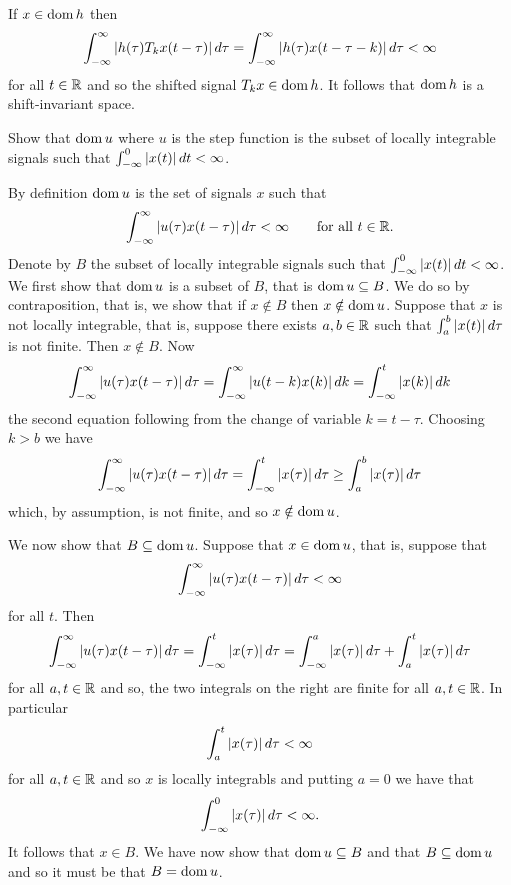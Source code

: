 \begin{excersizelist}
\begin{solution}
If $x \in \operatorname{dom} h$ then
\[
\int_{-\infty}^\infty \left\vert h(\tau) T_k x(t - \tau) \right\vert d\tau = \int_{-\infty}^\infty \left\vert h(\tau) x(t - \tau - k) \right\vert d\tau < \infty
\]
for all $t \in {\mathbb R}$ and so the shifted signal $T_k x \in \operatorname{dom} h$.  It follows that $\operatorname{dom} h$ is a shift-invariant space.
\end{solution}

\item Show that $\operatorname{dom} u$ where $u$ is the step function is the subset of locally integrable signals such that $\int_{-\infty}^0\left\vert x(t) \right\vert dt < \infty$.
\begin{solution}
By definition $\operatorname{dom} u$ is the set of signals $x$ such that
\[
\int_{-\infty}^{\infty} \left\vert u(\tau) x(t - \tau) \right\vert d\tau < \infty \qquad \text{for all $t \in {\mathbb R}$}.
\]
Denote by $B$ the subset of locally integrable signals such that $\int_{-\infty}^0\left\vert x(t) \right\vert dt < \infty$.  We first show that $\operatorname{dom} u$ is a subset of $B$, that is $\operatorname{dom} u \subseteq B$.  We do so by contraposition, that is, we show that if $x \notin B$ then $x \notin \operatorname{dom} u$.  Suppose that $x$ is not locally integrable, that is, suppose there exists $a, b \in {\mathbb R}$ such that $\int_{a}^{b} \left\vert x(t) \right\vert d\tau$ is not finite.  Then $x \notin B$.  Now
\[
\int_{-\infty}^{\infty} \left\vert u(\tau) x(t - \tau) \right\vert d\tau = \int_{-\infty}^{\infty} \left\vert u(t - k) x(k) \right\vert dk = \int_{-\infty}^{t} \left\vert x(k) \right\vert dk
\]
the second equation following from the change of variable $k = t - \tau$.  Choosing $k > b$ we have
\[
\int_{-\infty}^{\infty} \left\vert u(\tau) x(t - \tau) \right\vert d\tau = \int_{-\infty}^{t} \left\vert x(\tau) \right\vert d\tau \geq \int_{a}^{b} \left\vert x(\tau) \right\vert d\tau
\]
which, by assumption, is not finite, and so $x \notin \operatorname{dom} u$.  

We now show that $B \subseteq \operatorname{dom} u$.  Suppose that $x \in \operatorname{dom} u$, that is, suppose that
\[
\int_{-\infty}^{\infty} \left\vert u(\tau) x(t - \tau) \right\vert d\tau < \infty
\]
for all $t$.  Then
\[
\int_{-\infty}^{\infty} \left\vert u(\tau) x(t - \tau) \right\vert d\tau = \int_{-\infty}^{t} \left\vert x(\tau) \right\vert d\tau = \int_{-\infty}^{a} \left\vert x(\tau) \right\vert d\tau + \int_{a}^{t} \left\vert x(\tau) \right\vert d\tau
\]
for all $a, t \in {\mathbb R}$ and so, the two integrals on the right are finite for all $a,t \in {\mathbb R}$.  In particular
\[
\int_{a}^{t} \left\vert x(\tau) \right\vert d\tau < \infty
\]
for all $a, t \in {\mathbb R}$ and so $x$ is locally integrabls and putting $a = 0$ we have that
\[
\int_{-\infty}^{0} \left\vert x(\tau) \right\vert d\tau < \infty.
\]
It follows that $x \in B$.  We have now show that $\operatorname{dom} u \subseteq B$ and that $B \subseteq \operatorname{dom} u$ and so it must be that $B = \operatorname{dom} u$.
\end{solution} 


\end{excersizelist}
